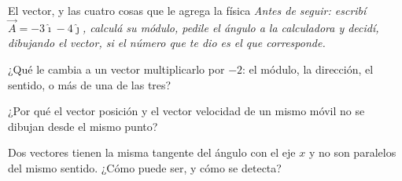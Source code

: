 \documentclass[11pt,openany]{book}
\begin{document}
\begin{bloque}{El vector, y las cuatro cosas que le agrega la física}
\textit{Antes de seguir: escribí $\vec A = -3\hat\imath - 4\hat\jmath$, calculá su módulo, pedile el ángulo a la calculadora y decidí, dibujando el vector, si el número que te dio es el que corresponde.}
\end{bloque}

\begin{chequeo}
\item ¿Qué le cambia a un vector multiplicarlo por $-2$: el módulo, la dirección, el sentido, o más de una de las tres?
\item ¿Por qué el vector posición y el vector velocidad de un mismo móvil no se dibujan desde el mismo punto?
\item Dos vectores tienen la misma tangente del ángulo con el eje $x$ y no son paralelos del mismo sentido. ¿Cómo puede ser, y cómo se detecta?
\end{chequeo}
\end{document}
